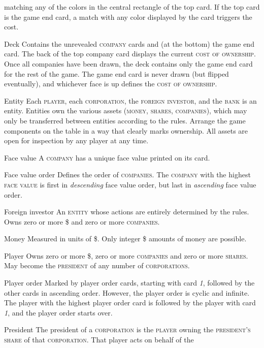 \documentclass[11pt,a4paper]{article}
\newenvironment{my_description}
  {\begin{list}{}{\setlength{\labelwidth}{0pt}
   \leftmargin=1.2em
   \setlength{\itemindent}{-\leftmargin}
   \renewcommand{\makelabel}{\descriptionlabel}}
  \setlength{\itemsep}{1pt}
  \setlength{\parskip}{0pt}
  \setlength{\parsep}{0pt}
  }
  {\end{list}}
\begin{document}
\begin{multicols}{2}
{\begin{my_description}
  matching any of the colors in the central rectangle of the top
  card. If the top card is the game end card, a match with any color
  displayed by the card triggers the cost.
\item[Deck] Contains the unrevealed \textsc{company} cards and (at the
  bottom) the game end card. The back of the top company card displays
  the current \textsc{cost of ownership}. Once all companies have been
  drawn, the deck contains only the game end card for the rest of the
  game. The game end card is never drawn (but flipped eventually), and
  whichever face is up defines the \textsc{cost of ownership}.
\item[Entity] Each \textsc{player}, each \textsc{corporation}, the
  \textsc{foreign investor}, and the \textsc{bank} is an
  entity. Entities own the various assets (\textsc{money},
  \textsc{shares}, \textsc{companies}), which may only
  be transferred between entities according to the rules. Arrange the
  game components on the table in a way that clearly marks ownership.
  All assets are open for inspection by any player at any time.
\item[Face value] A \textsc{company} has a unique face value printed
  on its card.
\item[Face value order] Defines the order of \textsc{companies}.  The
  \textsc{company} with the highest \textsc{face value} is first in
  \emph{descending} face value order, but last in \emph{ascending}
  face value order.
\item[Foreign investor] An \textsc{entity} whose actions are entirely
  determined by the rules. Owns zero or more \$ and zero or more
  \textsc{companies}.
\item[Money] Measured in units of \$. Only integer \$ amounts of money
  are possible.
\item[Player] Owns zero or more \$, zero or more \textsc{companies}
  and zero or more \textsc{shares}. May become the \textsc{president}
  of any number of \textsc{corporations}.
\item[Player order] Marked by player order cards, starting with card
  \emph{1}, followed by the other cards in ascending order. However,
  the player order is cyclic and infinite. The player with the highest
  player order card is followed by the player with card \emph{1}, and
  the player order starts over.
\item[President] The president of a \textsc{corporation} is the
  \textsc{player} owning the \textsc{president's} \textsc{share} of that
  \textsc{corporation}. That player acts on behalf of the

\end{my_description}}
\end{multicols}
\end{document}
